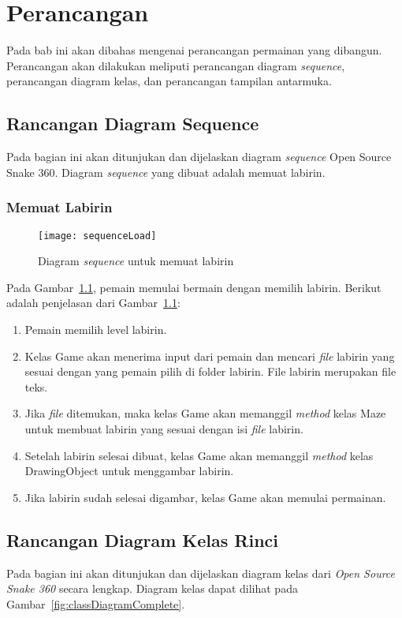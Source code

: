 \chapter{Perancangan}
\label{chap:perancangan}

Pada bab ini akan dibahas mengenai perancangan permainan yang dibangun. Perancangan akan dilakukan meliputi perancangan diagram \textit{sequence}, perancangan diagram kelas, dan perancangan tampilan antarmuka.

\section{Rancangan Diagram Sequence}
Pada bagian ini akan ditunjukan dan dijelaskan diagram \textit{sequence} Open Source Snake 360. Diagram \textit{sequence} yang dibuat adalah memuat labirin. 

\subsection{Memuat Labirin}
\begin{figure}[H]
	\centering  
	\texttt{[image: sequenceLoad]}  
	\caption[Diagram \textit{sequence} untuk memuat labirin]{Diagram \textit{sequence} untuk memuat labirin}
	\label{fig:sequenceLoad} 
\end{figure}

Pada Gambar~\ref{fig:sequenceLoad}, pemain memulai bermain dengan memilih labirin. Berikut adalah penjelasan dari Gambar~\ref{fig:sequenceLoad}:

\begin{enumerate}
	\item Pemain memilih level labirin. 
	\item Kelas Game akan menerima input dari pemain dan mencari \textit{file} labirin yang sesuai dengan yang pemain pilih di folder labirin. File labirin merupakan file teks.
	\item Jika \textit{file} ditemukan, maka kelas Game akan memanggil \textit{method} kelas Maze untuk membuat labirin yang sesuai dengan isi \textit{file} labirin. 
	\item Setelah labirin selesai dibuat, kelas Game akan memanggil \textit{method} kelas DrawingObject untuk menggambar labirin.
	\item Jika labirin sudah selesai digambar, kelas Game akan memulai permainan.
\end{enumerate}

\section{Rancangan Diagram Kelas Rinci}
Pada bagian ini akan ditunjukan dan dijelaskan diagram kelas dari \textit{Open Source Snake 360} secara lengkap. Diagram kelas dapat dilihat pada Gambar~\ref{fig:classDiagramComplete}.

